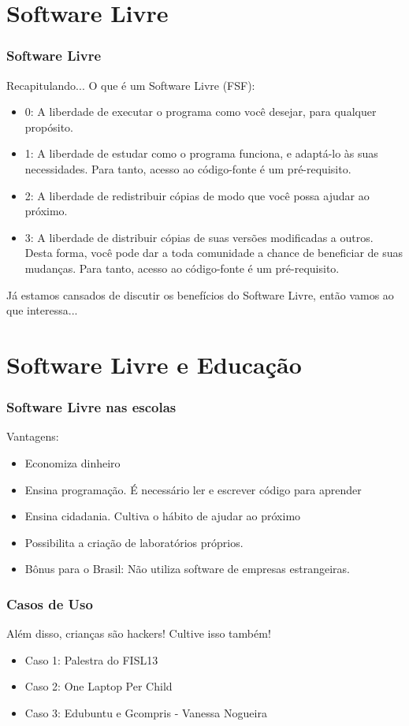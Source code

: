 \documentclass[serif,mathserif]{beamer}
\begin{document}
\section{Software Livre}
\begin{frame}
  \frametitle{Software Livre}
  Recapitulando... O que é um Software Livre (FSF):\pause
  \begin{itemize}[<+->]
    \item 0: A liberdade de executar o programa como você desejar, para qualquer propósito.
    \item 1: A liberdade de estudar como o programa funciona, e adaptá-lo às suas necessidades. Para tanto, acesso ao código-fonte é um pré-requisito.
    \item 2: A liberdade de redistribuir cópias de modo que você possa ajudar ao próximo.
    \item 3: A liberdade de distribuir cópias de suas versões modificadas a outros. Desta forma, você pode dar a toda comunidade a chance de beneficiar de suas mudanças. Para tanto, acesso ao código-fonte é um pré-requisito.
  \end{itemize}
\end{frame}
\begin{frame}
  Já estamos cansados de discutir os benefícios do Software Livre, então vamos ao que interessa...
\end{frame}

\section{Software Livre e Educação}
\begin{frame}
  \frametitle{Software Livre nas escolas}
  \pause
  Vantagens:\pause
  \begin{itemize}[<+->]
    \item Economiza dinheiro
    \item Ensina programação. É necessário ler e escrever código para aprender
    \item Ensina cidadania. Cultiva o hábito de ajudar ao próximo
    \item Possibilita a criação de laboratórios próprios.
    \item Bônus para o Brasil: Não utiliza software de empresas estrangeiras.
  \end{itemize}
\end{frame}

\begin{frame}
  \frametitle{Casos de Uso}
  Além disso, crianças são hackers! Cultive isso também!\pause
  \begin{itemize}[<+->]
    \item Caso 1: Palestra do FISL13
    \item Caso 2: One Laptop Per Child
    \item Caso 3: Edubuntu e Gcompris - Vanessa Nogueira
  \end{itemize}
\end{frame}
\end{document}
